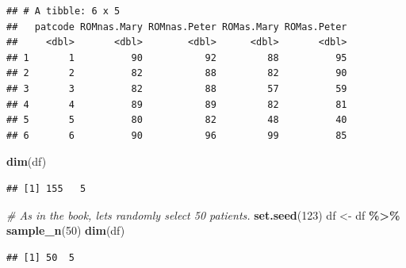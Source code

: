 \documentclass[
]{book}
\newenvironment{Shaded}{\begin{snugshade}}{\end{snugshade}}
\newcommand{\CommentTok}[1]{\textcolor[rgb]{0.56,0.35,0.01}{\textit{#1}}}
\newcommand{\DecValTok}[1]{\textcolor[rgb]{0.00,0.00,0.81}{#1}}
\newcommand{\FunctionTok}[1]{\textcolor[rgb]{0.13,0.29,0.53}{\textbf{#1}}}
\newcommand{\NormalTok}[1]{#1}
\newcommand{\OtherTok}[1]{\textcolor[rgb]{0.56,0.35,0.01}{#1}}
\newcommand{\SpecialCharTok}[1]{\textcolor[rgb]{0.81,0.36,0.00}{\textbf{#1}}}
\begin{document}
\begin{verbatim}
## # A tibble: 6 x 5
##   patcode ROMnas.Mary ROMnas.Peter ROMas.Mary ROMas.Peter
##     <dbl>       <dbl>        <dbl>      <dbl>       <dbl>
## 1       1          90           92         88          95
## 2       2          82           88         82          90
## 3       3          82           88         57          59
## 4       4          89           89         82          81
## 5       5          80           82         48          40
## 6       6          90           96         99          85
\end{verbatim}

\begin{Shaded}
\begin{Highlighting}[]
\FunctionTok{dim}\NormalTok{(df)}
\end{Highlighting}
\end{Shaded}

\begin{verbatim}
## [1] 155   5
\end{verbatim}

\begin{Shaded}
\begin{Highlighting}[]
\CommentTok{\# As in the book, let\textquotesingle{}s randomly select 50 patients.}
\FunctionTok{set.seed}\NormalTok{(}\DecValTok{123}\NormalTok{)}
\NormalTok{df }\OtherTok{\textless{}{-}}\NormalTok{ df }\SpecialCharTok{\%\textgreater{}\%} \FunctionTok{sample\_n}\NormalTok{(}\DecValTok{50}\NormalTok{)}
\FunctionTok{dim}\NormalTok{(df)}
\end{Highlighting}
\end{Shaded}

\begin{verbatim}
## [1] 50  5
\end{verbatim}
\end{document}
